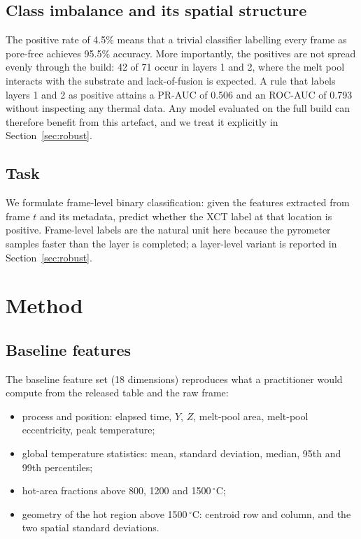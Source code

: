 \documentclass[preprint,12pt]{elsarticle}
\begin{document}
\subsection{Class imbalance and its spatial structure}

The positive rate of 4.5\% means that a trivial classifier labelling every frame as pore-free achieves 95.5\% accuracy. More importantly, the positives are not spread evenly through the build: 42 of 71 occur in layers 1 and 2, where the melt pool interacts with the substrate and lack-of-fusion is expected. A rule that labels layers 1 and 2 as positive attains a PR-AUC of 0.506 and an ROC-AUC of 0.793 without inspecting any thermal data. Any model evaluated on the full build can therefore benefit from this artefact, and we treat it explicitly in Section~\ref{sec:robust}.

\subsection{Task}

We formulate frame-level binary classification: given the features extracted from frame $t$ and its metadata, predict whether the XCT label at that location is positive. Frame-level labels are the natural unit here because the pyrometer samples faster than the layer is completed; a layer-level variant is reported in Section~\ref{sec:robust}.

\section{Method}

\subsection{Baseline features}

The baseline feature set (18 dimensions) reproduces what a practitioner would compute from the released table and the raw frame:

\begin{itemize}
\item process and position: elapsed time, $Y$, $Z$, melt-pool area, melt-pool eccentricity, peak temperature;
\item global temperature statistics: mean, standard deviation, median, 95th and 99th percentiles;
\item hot-area fractions above 800, 1200 and 1500\,$^\circ$C;
\item geometry of the hot region above 1500\,$^\circ$C: centroid row and column, and the two spatial standard deviations.
\end{itemize}
\end{document}
